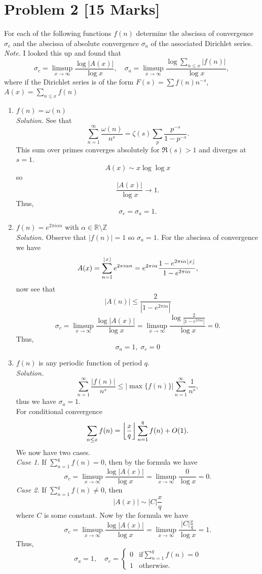 \documentclass[12pt]{article}
\begin{document}
\section*{Problem 2 [15 Marks]} For each of the following functions $f(n)$ determine the abscissa of convergence $\sigma_c$ and the abscissa of absolute convergence $\sigma_a$ of the associated Dirichlet series.\\
\textit{Note.} I looked this up and found that
\[
    \sigma_c=\limsup_{x\to\infty}\frac{\log|A(x)|}{\log x},\quad \sigma_a=\limsup_{x\to\infty}\frac{\log\sum_{n\leq x}|f(n)|}{\log x},
\]
where if the Dirichlet series is of the form $F(s)=\sum f(n)n^{-s}$, $A(x)=\sum_{n\leq x}f(n)$
\begin{enumerate}[label=(\alph*)]
    \item $f(n)=\omega(n)$\\
    \textit{Solution.} See that
    \[
        \sum_{n=1}^{\infty}\frac{\omega(n)}{n^s}=\zeta(s)\sum_{p}\frac{p^{-s}}{1-p^{-s}}.
    \]
    This sum over primes converges absolutely for $\Re(s)>1$ and diverges at $s=1$.
    \[
        A(x)\sim x\log\log x
    \]
    so
    \[
        \frac{|A(x)|}{\log x}\to 1.
    \]
    Thus,
    \[
        \sigma_c=\sigma_a=1.
    \]
    \item $f(n)=e^{2\pi i\alpha n}$ with $\alpha\in\mathbb{R}\setminus\mathbb{Z}$\\
    \textit{Solution.} Observe that $|f(n)|=1$ so $\sigma_a=1$. For the abscissa of convergence we have
    \[
        A(x)=\sum_{n=1}^{\left\lfloor x \right\rfloor}e^{2\pi i\alpha n}=e^{2\pi i\alpha}\frac{1-e^{2\pi i\alpha \left\lfloor x \right\rfloor}}{1-e^{2\pi i\alpha}},
    \]
    now see that
    \[
        |A(n)|\leq\frac{2}{|1-e^{2\pi i\alpha}|}
    \]
    \[
        \sigma_c=\limsup_{x\to\infty}\frac{\log|A(x)|}{\log x}=\limsup_{x\to\infty}\frac{\log\frac{2}{|1-e^{2\pi i\alpha}|}}{\log x}=0.
    \]
    Thus,
    \[
        \sigma_a=1,\;\sigma_c=0
    \]
    \newpage
    \item $f(n)$ is any periodic function of period $q$.\\
    \textit{Solution.}
    \[
        \sum_{n=1}^{\infty}\frac{|f(n)|}{n^s}\leq |\max\{f(n)\}|\sum_{n=1}^{\infty}\frac{1}{n^s},
    \]
    thus we have $\sigma_a=1$.\\
    For conditional convergence
    \[
        \sum_{n\leq x}f(n)=\left\lfloor \frac{x}{q} \right\rfloor\sum_{n=1}^{q}f(n)+O(1).
    \]
    We now have two cases.\\
    \textit{Case 1.} If $\sum_{n=1}^{q}f(n)=0$, then by the formula we have
    \[
        \sigma_c=\limsup_{x\to\infty}\frac{\log|A(x)|}{\log x}=\limsup_{x\to\infty}\frac{0}{\log x}=0.
    \]
    \textit{Case 2.} If $\sum_{n=1}^{q}f(n)\neq0$, then 
    \[
        |A(x)|\sim |C|\frac{x}{q}
    \]
    where $C$ is some constant. Now by the formula we have
    \[
        \sigma_c=\limsup_{x\to\infty}\frac{\log|A(x)|}{\log x}=\limsup_{x\to\infty}\frac{|C|\frac{x}{q}}{\log x}=1.
    \]
    Thus,
    \[
        \sigma_a=1,\quad \sigma_c=
        \begin{cases}
            0&\text{if} \sum_{n=1}^{q}f(n)=0\\
            1&\text{otherwise}.    
        \end{cases}
    \]
\end{enumerate}
\newpage
{}
\end{document}
